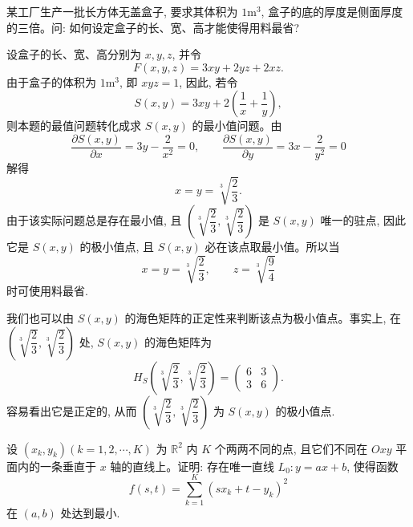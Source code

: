 \begin{example}\label{example:ma-14-5-2}
某工厂生产一批长方体无盖盒子, 要求其体积为 $1\mathrm{m}^3$, 盒子的底的厚度是侧面厚度的三倍。问: 如何设定盒子的长、宽、高才能使得用料最省?
\end{example}


\begin{solve}
设盒子的长、宽、高分别为 $x,y,z$, 并令
\[
  F(x,y,z)=3xy+2yz+2xz.
\]
由于盒子的体积为 $1\mathrm{m}^3$, 即 $xyz=1$, 因此, 若令
\[
  S(x,y)=3xy+2\left(\frac1x+\frac1y\right),
\]
则本题的最值问题转化成求 $S(x,y)$ 的最小值问题。由
\[
  \frac{\partial S(x,y)}{\partial x}=3y-\frac2{x^2}=0,\qquad
  \frac{\partial S(x,y)}{\partial y}=3x-\frac2{y^2}=0
\]
解得
\[
  x=y=\sqrt[3]{\frac23}.
\]
由于该实际问题总是存在最小值, 且 $\left(\sqrt[3]{\dfrac23},\sqrt[3]{\dfrac23}\right)$ 是 $S(x,y)$ 唯一的驻点, 因此它是 $S(x,y)$ 的极小值点, 且 $S(x,y)$ 必在该点取最小值。所以当
\[
  x=y=\sqrt[3]{\frac23},\qquad z=\sqrt[3]{\frac94}
\]
时可使用料最省.

我们也可以由 $S(x,y)$ 的海色矩阵的正定性来判断该点为极小值点。事实上, 在 $\left(\sqrt[3]{\dfrac23},\sqrt[3]{\dfrac23}\right)$ 处, $S(x,y)$ 的海色矩阵为
\[
  H_S\left(\sqrt[3]{\frac23},\sqrt[3]{\frac23}\right)
  =
  \begin{pmatrix}
    6 & 3\\
    3 & 6
  \end{pmatrix}.
\]
容易看出它是正定的, 从而 $\left(\sqrt[3]{\dfrac23},\sqrt[3]{\dfrac23}\right)$ 为 $S(x,y)$ 的极小值点.
\end{solve}


\begin{example}\label{example:ma-14-5-3}
设 $(x_k,y_k)(k=1,2,\cdots,K)$ 为 $\mathbb R^2$ 内 $K$ 个两两不同的点, 且它们不同在 $Oxy$ 平面内的一条垂直于 $x$ 轴的直线上。证明: 存在唯一直线 $L_0:y=ax+b$, 使得函数
\[
  f(s,t)=\sum_{k=1}^K(sx_k+t-y_k)^2
\]
在 $(a,b)$ 处达到最小.
\end{example}


